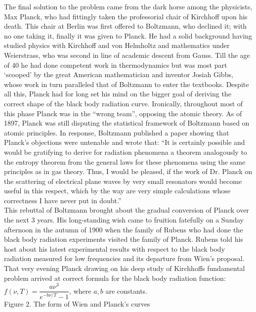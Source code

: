 \documentclass[11pt]{article} %
\numberwithin{equation}{section}
\begin{document}
The final solution to the problem came from the dark horse among the physicists, Max Planck, who had fittingly taken the professorial chair of Kirchhoff upon his death. This chair at Berlin was first offered to Boltzmann, who declined it; with no one taking it, finally it was given to Planck. He had a solid background having studied physics with Kirchhoff and von Helmholtz and mathematics under Weierstrass, who was second in line of academic descent from Gauss. Till the age of 40 he had done competent work in thermodynamics but was most part ‘scooped’ by the great American mathematician and inventor Josiah Gibbs, whose work in turn paralleled that of Boltzmann to enter the textbooks. Despite all this, Planck had for long set his mind on the bigger goal of deriving the correct shape of the black body radiation curve. Ironically, throughout most of this phase Planck was in the “wrong team”, opposing the atomic theory. As of 1897, Planck was still disputing the statistical framework of Boltzmann based on atomic principles. In response, Boltzmann published a paper showing that Planck’s objections were untenable and wrote that: “It is certainly possible and would be gratifying to derive for radiation phenomena a theorem analogously to the entropy theorem from the general laws for these phenomena using the same principles as in gas theory. Thus, I would be pleased, if the work of Dr. Planck on the scattering of electrical plane waves by very small resonators would become useful in this respect, which by the way are very simple calculations whose correctness I have never put in doubt.”\\

This rebuttal of Boltzmann brought about the gradual conversion of Planck over the next 3 years. His long-standing wish came to fruition fatefully on a Sunday afternoon in the autumn of 1900 when the family of Rubens who had done the black body radiation experiments visited the family of Planck. Rubens told his host about his latest experimental results with respect to the black body radiation measured for low frequencies and its departure from Wien’s proposal. That very evening Planck drawing on his deep study of Kirchhoffs fundamental problem arrived at correct formula for the black body radiation function:\\
 $f(\nu, T)=\dfrac{a\nu^3}{e^{-b\nu/T}-1}$, where $a,b$ are constants.\\

Figure 2. The form of Wien and Planck’s curves\\
\end{document}
